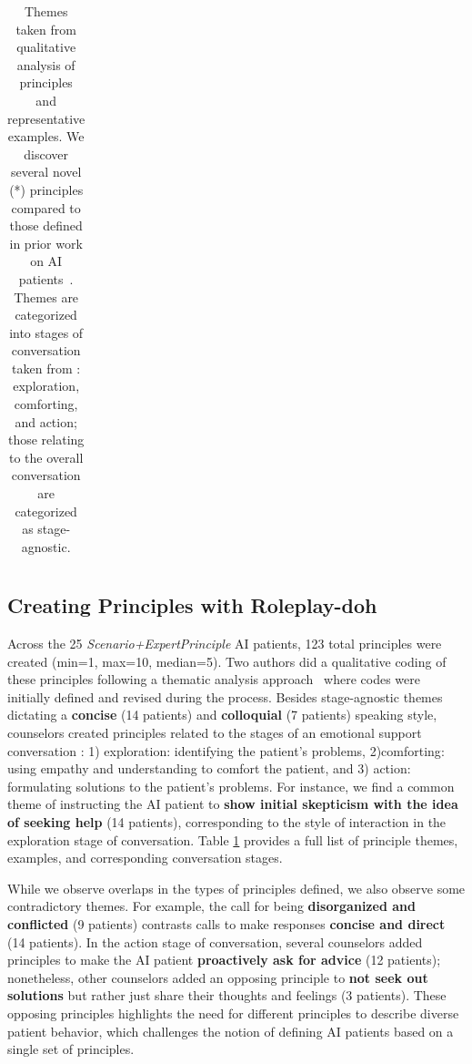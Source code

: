 \documentclass[11pt]{article}
\newcommand{\diyi}[1]{\ifthenelse{\boolean{showcomments}}{\textcolor{blue}{[#1 —diyi]}}{}}
\begin{document}
\begin{table}
{\begin{tabular}{|p{0.1cm}|p{.1cm}|p{.1cm}|c|p{5cm}|p{8cm}|}
    \end{tabular}}
    \caption{\small{Themes taken from qualitative analysis of principles and representative examples. We discover several novel (\colorbox{yellow!30}{*}) principles compared to those defined in prior work on AI patients~\cite{chen2023llmempowered, stapleton2023seeing}. Themes are categorized into stages of conversation taken from \cite{DBLP:journals/corr/abs-2106-01144}: \colorbox{orange!40}{exploration}, \colorbox{blue!30}{comforting}, and \colorbox{green!60}{action}; those relating to the overall conversation are categorized as \colorbox{gray!60}{stage-agnostic}.}}
    \label{tab:principle_table}
\end{table}


\subsection{Creating Principles with Roleplay-doh}
Across the 25 \textit{Scenario+ExpertPrinciple} AI patients, 123 total principles were created (min=1, max=10, median=5). Two authors did a qualitative coding of these principles following a thematic analysis approach~\cite{braun2006thematicanalysis} where codes were initially defined and revised during the process.
Besides \colorbox{gray!60}{stage-agnostic} themes dictating a \textbf{concise} (14 patients) and \textbf{colloquial} (7 patients) speaking style, counselors created principles related to the stages of an emotional support conversation \cite{DBLP:journals/corr/abs-2106-01144}: 1) \colorbox{orange!40}{exploration}: identifying the patient's problems, 2)\colorbox{blue!30}{comforting}: using empathy and understanding to comfort the patient, and 3) \colorbox{green!60}{action}: formulating solutions to the patient's problems. For instance, we find a common theme of instructing the AI patient to \textbf{show initial skepticism with the idea of seeking help} (14 patients), corresponding to the style of interaction in the \colorbox{orange!40}{exploration} stage of conversation. Table \ref{tab:principle_table} provides a full list of principle themes, examples, and corresponding conversation stages. 

While we observe overlaps in the types of principles defined, we also observe some contradictory themes. For example, the call for being \textbf{disorganized and conflicted} (9 patients) contrasts calls to make responses \textbf{concise and direct} (14 patients). In the \colorbox{green!60}{action} stage of conversation, several counselors added principles to make the AI patient \textbf{proactively ask for advice} (12 patients); nonetheless, other counselors added an opposing principle to \textbf{not seek out solutions} but rather just share their thoughts and feelings (3 patients). These opposing principles highlights the need for different principles to describe diverse patient behavior, which challenges the notion of defining AI patients based on a single set of principles. 
\end{document}
